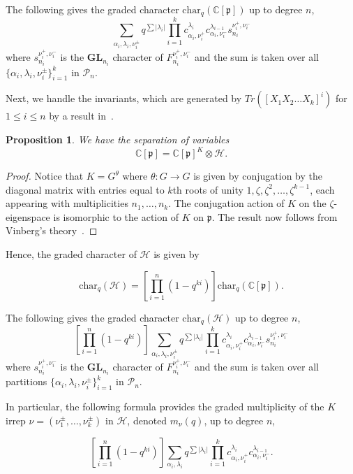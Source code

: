 \documentclass[11pt]{article}
\newtheorem{prop}[theo]{Proposition}
\theoremstyle{definition}
\numberwithin{equation}{section}
\newcommand{\C}{\mathbb{C}}
\newcommand{\Ha}{\mathcal{H}}
\newcommand{\p}{\mathfrak{p}}
\newcommand{\chr}{\text{char}}
\newcommand{\GL}{\textbf{GL}}
\newcommand{\Par}{\mathcal{P}}
\begin{document}
\begin{cor}
    The following gives the graded character $\chr_q(\C[\p])$ up to degree $n$,
    $$\sum_{\alpha_i, \lambda_i, \nu_i^\pm} q^{\sum |\lambda_i|}\prod_{i=1}^k
    c^{\lambda_i}_{\alpha_i, \nu_i^+} c^{\lambda_{i-1}}_{\alpha_i, \nu_i^-} 
    s^{\nu_i^+, \nu_i^-}_{n_i}$$
where $s^{\nu_i^+, \nu_i^-}_{n_i}$ is the $\GL_{n_i}$ character of $F^{\nu_i^+, \nu_i^-}_{n_i}$ and the sum is taken over all $\{\alpha_i, \lambda_i, \nu_i^\pm\}_{i=1}^k$ in $\Par_n$.
    
\end{cor}

Next, we handle the invariants, which are generated by $Tr([X_1 X_2 \dots X_k]^i)$ for $1 \leq i \leq n$ by a result in~\cite{LeBryunProcesi1990}.
\begin{prop}
    We have the separation of variables
    \begin{equation*}
        \C[\p] = \C[\p]^K \otimes \Ha.
    \end{equation*}
\end{prop}
\begin{proof}
    Notice that $K = G^\theta$ where $\theta:G \to G$ is given by conjugation by the diagonal matrix with entries equal to $k$th roots of unity $1,\zeta,\zeta^2,\dots,\zeta^{k-1}$, each appearing with multiplicities $n_1,\dots,n_k$. The conjugation action of $K$ on the $\zeta$-eigenspace is isomorphic to the action of $K$ on $\p$. The result now follows from Vinberg's theory~\cite{Vinberg1976}.
\end{proof}
 
Hence, the graded character of $\Ha$ is given by

$$\chr_q(\Ha) = [\prod_{i=1}^n(1-q^{ki})]\chr_q(\C[\p]).$$

\begin{cor} \label{cor-gradedHchar}
    The following gives the graded character $\chr_q(\Ha)$ up to degree $n$,
    $$[\prod_{i=1}^n(1-q^{ki})]\sum_{\alpha_i, \lambda_i, \nu_i^\pm} q^{\sum |\lambda_i|}\prod_{i=1}^k
    c^{\lambda_i}_{\alpha_i, \nu_i^+} c^{\lambda_{i-1}}_{\alpha_i, \nu_i^-} 
    s^{\nu_i^+, \nu_i^-}_{n_i}$$
 where $s^{\nu_i^+, \nu_i^-}_{n_i}$ is the $\GL_{n_i}$ character of $F^{\nu_i^+, \nu_i^-}_{n_i}$ and the sum is taken over all partitions $\{\alpha_i, \lambda_i, \nu_i^\pm\}_{i=1}^k$ in $\Par_n$.

    In particular, the following formula provides the graded multiplicity of the $K$ irrep $\nu = (\nu_1^\pm, \dots , \nu_k^\pm)$ in $\Ha$, denoted $m_{\nu}(q)$, up to degree $n$,

    $$[\prod_{i=1}^n(1-q^{ki})]\sum_{\alpha_i, \lambda_i} q^{\sum |\lambda_i|}\prod_{i=1}^k
    c^{\lambda_i}_{\alpha_i, \nu_i^+} c^{\lambda_{i-1}}_{\alpha_i, \nu_i^-}.$$
\end{cor}
\end{document}
